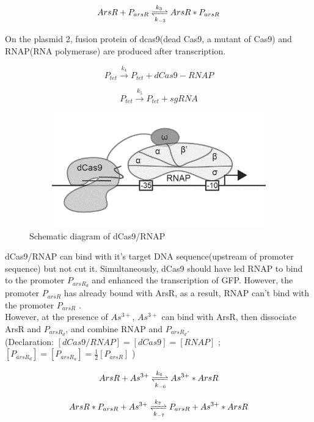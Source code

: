 \begin{equation}
ArsR+P_{arsR} \xrightleftharpoons[k_{-3}]{k_3}ArsR*P_{arsR} 
\end{equation} 

On the plasmid 2, fusion protein of dcas9(dead Cas9, a mutant of Cas9) and RNAP(RNA polymerase) are produced after transcription.

\begin{equation}
P_{tet} \stackrel{k_{4}}{\longrightarrow} P_{tet} +dCas9-RNAP
\end{equation}

\begin{equation}
P_{tet} \stackrel{k_{5}}{\longrightarrow} P_{tet} +sgRNA
\end{equation}

\begin{figure}[h]
	\centering
	\includegraphics[width=12cm,height=5cm]{2}
	\caption{Schematic diagram of dCas9/RNAP}
\end{figure}

dCas9/RNAP can bind with it's target DNA sequence(upstream of promoter sequence) but not cut it. Simultaneously, dCas9 should have led RNAP to bind to the promoter $P_{arsR_d}$ and enhanced the transcription of GFP. However, the promoter $P_{arsR}$ has already bound with ArsR, as a result, RNAP can't bind with the promoter $P_{arsR}$ . \\ 

However, at the presence of $As^{3+}$, $As^{3+}$ can bind with ArsR, then dissociate ArsR and $P_{arsR_d}$, and combine RNAP and $P_{arsR_d}$. \\

(Declaration: $[dCas9/RNAP] = [dCas9] = [RNAP]$ ; $[P_{arsR_d}] = [P_{arsR_u}] = \frac{1}{2}[P_{arsR}]$ )

\begin{equation}
ArsR +As^{3+}\xrightleftharpoons[k_{-6}]{k_6}As^{3+}*ArsR
\end{equation}

\begin{equation}
ArsR*P_{arsR} +As^{3+}\xrightleftharpoons[k_{-7}]{k_7}P_{arsR}+ As^{3+}*ArsR
\end{equation}

